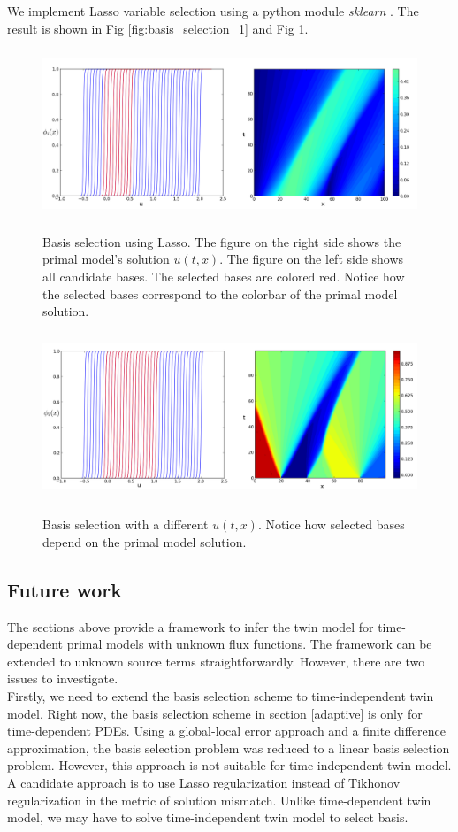 \documentclass[a4paper,onecolumn]{article}
\theoremstyle{remark}
\begin{document}
\noindent We implement Lasso variable selection using a python module \emph{sklearn} \cite{sklearn}.
The result is shown in Fig \ref{fig:basis_selection_1} and Fig \ref{fig:basis_selection_2}.
\begin{figure}[H]\begin{center}
    \includegraphics[height=5cm]{all.png}
    \caption{Basis selection using Lasso. The figure on the right side shows
    the primal model's solution $u(t,x)$. The figure on the left side shows all
    candidate bases. The selected bases are colored red. Notice how the selected
    bases correspond to the colorbar of the primal model solution.}
    \label{fig:basis_selection_1}
    \includegraphics[height=5cm]{all2.png}
    \caption{Basis selection with a different $u(t,x)$. Notice
    how selected bases depend on the primal model solution.}
    \label{fig:basis_selection_2}
\end{center}
\end{figure}

\subsection{Future work}
\label{future work}
The sections above provide a framework to infer the twin model for time-dependent primal models 
with unknown flux functions. The framework can be extended to unknown source terms
straightforwardly. However, there are two issues to investigate.\\

\noindent Firstly, we need to extend the basis selection scheme to
time-independent twin model.
Right now, the basis selection scheme in section \ref{adaptive} is only for time-dependent PDEs.
Using a global-local error approach and a finite difference approximation, the basis
selection problem was reduced to a linear basis selection problem.
However, this approach is not suitable for time-independent twin model.
A candidate approach is to use Lasso regularization instead of Tikhonov regularization
in the metric of solution mismatch.
Unlike time-dependent twin model,
we may have to solve time-independent twin model to select basis.\\
\end{document}
